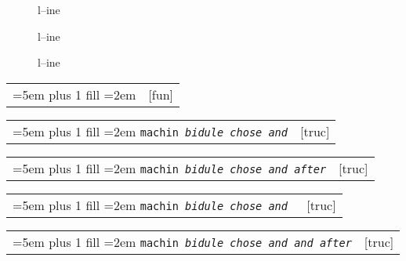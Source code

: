 \documentclass{book}
\begin{document}
\begin{titlepage}
\begin{description}
\item[{\parbox[b]{\linewidth}{%
a}}]
l--ine
\end{description}

\begin{description}
\item[{\parbox[b]{\linewidth}{%
a--missing style formatting}}]
l--ine
\end{description}

\begin{description}
\item[{\parbox[b]{\linewidth}{%
a\\
\index[fn]{a@\texttt{a}}%
\index[cp]{index entry between item and itemx}%
b
\index[fn]{b@\texttt{b}}%
}}]
l--ine
\end{description}


\noindent\begin{tabularx}{\linewidth}{@{}Xr}
\rightskip=5em plus 1 fill
\hangindent=2em
\texttt{}& [fun]
\end{tabularx}


\noindent\begin{tabularx}{\linewidth}{@{}Xr}
\rightskip=5em plus 1 fill
\hangindent=2em
\texttt{machin \EmbracOn{}\textnormal{\textsl{bidule chose and}}\EmbracOff{}}& [truc]
\end{tabularx}

%

\noindent\begin{tabularx}{\linewidth}{@{}Xr}
\rightskip=5em plus 1 fill
\hangindent=2em
\texttt{machin \EmbracOn{}\textnormal{\textsl{bidule chose and  after}}\EmbracOff{}}& [truc]
\end{tabularx}

%

\noindent\begin{tabularx}{\linewidth}{@{}Xr}
\rightskip=5em plus 1 fill
\hangindent=2em
\texttt{machin \EmbracOn{}\textnormal{\textsl{bidule chose and }}\EmbracOff{}}& [truc]
\end{tabularx}

%

\noindent\begin{tabularx}{\linewidth}{@{}Xr}
\rightskip=5em plus 1 fill
\hangindent=2em
\texttt{machin \EmbracOn{}\textnormal{\textsl{bidule chose and and after}}\EmbracOff{}}& [truc]
\end{tabularx}


\end{titlepage}
\end{document}

